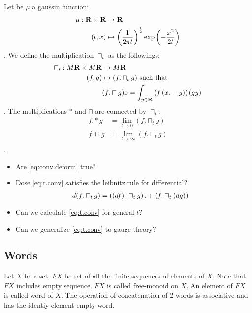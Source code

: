 \begin{observe}
Let be $\mu$ a gaussin function:
\begin{equation}\begin{split}
	\mu:{\mathbf{R}}\times{\mathbf{R}} &\to {\mathbf{R}} \\
		(t,x) &\mapsto \left({\frac{1}{2 \pi t}}\right)^{\frac{1}{2}}\exp\left({-\frac{x^2}{2t}}\right) \\
\end{split}\end{equation}
. We define the multiplication $\sqcap_t$ as the followings:
\begin{equation}\begin{split}\label{eq:t.conv}
	\sqcap_t: M{\mathbf{R}}\times M{\mathbf{R}} &\to M{\mathbf{R}} \\
	(f,g) &\mapsto (f.\sqcap_t g) \text{ such that} \\
	& (f.\sqcap g)x = \int_{y\in{\mathbf{R}}}\left({f\left({x.-y}\right)}\right)\left({gy}\right) \\
\end{split}\end{equation}
. The multiplications $*$ and $\sqcap$ are connected by $\sqcap_t$:
\begin{equation}\begin{split}\label{eq:conv.deform}
	f.*g &= \lim_{t\to0}(f.\sqcap_tg) \\
	f.\sqcap g &= \lim_{t\to\infty}(f.\sqcap_tg) \\
\end{split}\end{equation}
.
\begin{itemize}
\item Are \eqref{eq:conv.deform} true?
\item Dose \eqref{eq:t.conv} satisfies the leibnitz rule for differential?
\begin{equation}\begin{split}
	d(f.\sqcap_tg) &= \left({\left({df}\right).\sqcap_tg}\right).+\left({f.\sqcap_t\left({dg}\right)}\right)
\end{split}\end{equation}
\item Can we calculate \eqref{eq:t.conv} for general $t$?
\item Can we generalize \eqref{eq:t.conv} to gauge theory?
\end{itemize}
\end{observe}

\subsection{Words}
\begin{definition}
Let $X$ be a set, $FX$ be set of all the finite sequences of elements of $X$.
Note that $FX$ includes empty sequence. $FX$ is called free-monoid on $X$.
An element of $FX$ is called word of $X$.
The operation of concatenation of 2 words is associative and has the identiy
element empty-word.
\end{definition}

